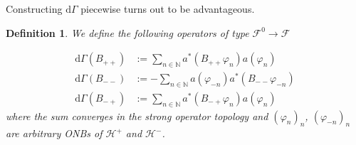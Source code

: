 \documentclass[b5paper,draft,openbib,12pt]{memoir}
\newtheorem{Def}{Definition}
\begin{document}
Constructing \(\mathrm{d}\Gamma\) piecewise turns out to be advantageous. 

\begin{Def}
We define the following operators of type \(\mathcal{F}^0\rightarrow \mathcal{F}\)

\begin{align}\label{predefdGamma}
\mathrm{d}\Gamma(B_{++})&:= \sum_{n\in\mathbb{N}}  a^*(B_{++} \varphi_n) a(\varphi_n) \\
\mathrm{d}\Gamma(B_{--})&:= -\sum_{n\in\mathbb{N}}   a(\varphi_{-n})a^*(B_{--} \varphi_{-n}) \\
\mathrm{d}\Gamma(B_{-+})&:= \sum_{n\in\mathbb{N}}  a^*(B_{-+}\varphi_{n}) a(\varphi_n)
\end{align}
where the sum converges in the strong operator topology and 
\((\varphi_n)_n \), \((\varphi_{-n})_n\) are arbitrary 
ONBs of \(\mathcal{H}^+\) and \(\mathcal{H}^-\).
\end{Def}
\end{document}
